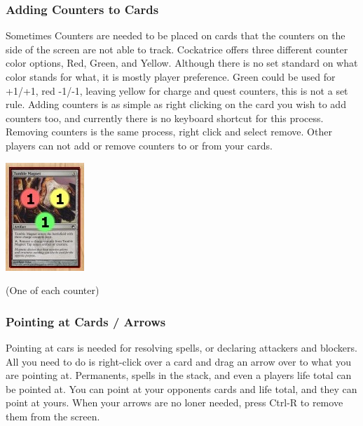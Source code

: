 \documentclass[a4paper]{scrbook}
\begin{document}
\subsubsection{Adding Counters to Cards}
Sometimes Counters are needed to be placed on cards that the counters on the side of the screen are not able to track. Cockatrice offers three different counter color options, Red, Green, and Yellow. Although there is no set standard on what color stands for what, it is mostly player preference. Green could be used for +1/+1, red -1/-1, leaving yellow for charge and quest counters, this is not a set rule. Adding counters is as simple as right clicking on the card you wish to add counters too, and currently there is no keyboard shortcut for this process. Removing counters is the same process, right click and select remove. Other players can not add or remove counters to or from your cards.

\begin{center}
\includegraphics{pics/fetch5170}
\end{center}
(One of each counter)

\subsubsection{Pointing at Cards / Arrows}
Pointing at cars is needed for resolving spells, or declaring attackers and blockers. All you need to do is right-click over a card and drag an arrow over to what you are pointing at. Permanents, spells in the stack, and even a players life total can be pointed at. You can point at your opponents cards and life total, and they can point at yours. When your arrows are no loner needed, press Ctrl-R to remove them from the screen.
\end{document}
